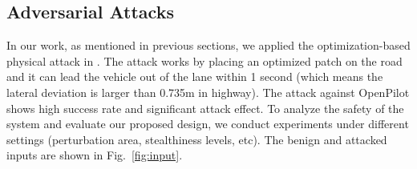 


\subsection{Adversarial Attacks}
In our work, as mentioned in previous sections, we applied the optimization-based physical attack in \cite{sato2020hold}. %
The attack works by placing an optimized patch on the road and it can lead the vehicle out of the lane within 1 second (which means the lateral deviation is larger than 0.735m in highway). The attack against OpenPilot shows high success rate and significant attack effect. To analyze the safety of the system and evaluate our proposed design, we conduct experiments under different settings (perturbation area, stealthiness levels, etc). The benign and attacked inputs are shown in Fig.~\ref{fig:input}.


